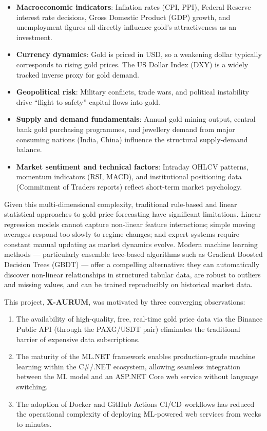 \begin{itemize}
  \item \textbf{Macroeconomic indicators}: Inflation rates (CPI, PPI), Federal Reserve interest rate decisions, Gross Domestic Product (GDP) growth, and unemployment figures all directly influence gold's attractiveness as an investment.
  \item \textbf{Currency dynamics}: Gold is priced in USD, so a weakening dollar typically corresponds to rising gold prices. The US Dollar Index (DXY) is a widely tracked inverse proxy for gold demand.
  \item \textbf{Geopolitical risk}: Military conflicts, trade wars, and political instability drive ``flight to safety'' capital flows into gold.
  \item \textbf{Supply and demand fundamentals}: Annual gold mining output, central bank gold purchasing programmes, and jewellery demand from major consuming nations (India, China) influence the structural supply-demand balance.
  \item \textbf{Market sentiment and technical factors}: Intraday OHLCV patterns, momentum indicators (RSI, MACD), and institutional positioning data (Commitment of Traders reports) reflect short-term market psychology.
\end{itemize}

Given this multi-dimensional complexity, traditional rule-based and linear statistical approaches to gold price forecasting have significant limitations. Linear regression models cannot capture non-linear feature interactions; simple moving averages respond too slowly to regime changes; and expert systems require constant manual updating as market dynamics evolve. Modern machine learning methods --- particularly ensemble tree-based algorithms such as Gradient Boosted Decision Trees (GBDT) --- offer a compelling alternative: they can automatically discover non-linear relationships in structured tabular data, are robust to outliers and missing values, and can be trained reproducibly on historical market data.

This project, \textbf{X-AURUM}, was motivated by three converging observations:

\begin{enumerate}
  \item The availability of high-quality, free, real-time gold price data via the Binance Public API (through the PAXG/USDT pair) eliminates the traditional barrier of expensive data subscriptions.
  \item The maturity of the ML.NET framework enables production-grade machine learning within the C\#/.NET ecosystem, allowing seamless integration between the ML model and an ASP.NET Core web service without language switching.
  \item The adoption of Docker and GitHub Actions CI/CD workflows has reduced the operational complexity of deploying ML-powered web services from weeks to minutes.
\end{enumerate}

